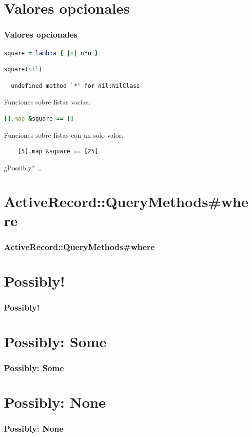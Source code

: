 \documentclass{beamer}
\begin{document}
\section{Valores opcionales}
\begin{frame}[fragile]
  \frametitle{Valores opcionales}

  \begin{lstlisting}[language=Ruby]
    square = lambda { |n| n*n }
  \end{lstlisting}
  \begin{lstlisting}[language=Ruby]
    square(nil)
  \end{lstlisting}

  \begin{verbatim}
  undefined method `*' for nil:NilClass
  \end{verbatim}

  Funciones sobre listas vacias.
  \begin{lstlisting}[language=Ruby]
    [].map &square == []
  \end{lstlisting}
  Funciones sobre listas con un solo valor.
  \begin{lstlisting}
    [5].map &square == [25]
  \end{lstlisting}
  ¿Possibly? \ldots
\end{frame}

\section{ActiveRecord::QueryMethods\#where}
\begin{frame}[fragile]
  \frametitle{ActiveRecord::QueryMethods\#where}
  
\end{frame}

\section{Possibly!}
\begin{frame}[fragile]
  \frametitle{Possibly!}
  
\end{frame}

\section{Possibly: Some}
\begin{frame}[fragile]
  \frametitle{Possibly: Some}
  
\end{frame}

\section{Possibly: None}
\begin{frame}[fragile]
  \frametitle{Possibly: None}
  
\end{frame}
\end{document}
